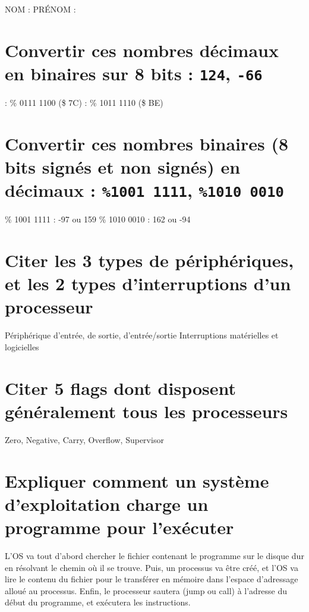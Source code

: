 \documentclass[11pt,a4paper]{article}
\author{Fabrice BOISSIER}
\begin{document}
\setlength{\fboxrule}{2pt}

\noindent {}

\bigskip

NOM : \hspace{6.5cm} PR\'ENOM :

\smallskip

\section{Convertir ces nombres décimaux en binaires sur 8 bits : \texttt{124}, \texttt{-66}}

 : \% 0111 1100 (\$ 7C)	 : \% 1011 1110 (\$ BE)
\bigskip

\section{Convertir ces nombres binaires (8 bits signés et non signés) en décimaux : \texttt{\%1001 1111}, \texttt{\%1010 0010}}

\bigskip
\% 1001 1111 : -97 ou 159	\qquad	\% 1010 0010 : 162 ou -94
\bigskip

\section{Citer les 3 types de périphériques, et les 2 types d'interruptions d'un processeur}

\bigskip
Périphérique d'entrée, de sortie, d'entrée/sortie \qquad Interruptions matérielles et logicielles
\bigskip

\section{Citer 5 flags dont disposent généralement tous les processeurs}

\bigskip
Zero, Negative, Carry, Overflow, Supervisor
\bigskip

\section{Expliquer comment un système d'exploitation charge un programme pour l'exécuter}

\bigskip

\noindent L'OS va tout d'abord chercher le fichier contenant le programme sur le disque dur en résolvant le chemin où il se trouve.
Puis, un processus va être créé, et l'OS va lire le contenu du fichier pour le transférer en mémoire dans l'espace d'adressage alloué au processus.
Enfin, le processeur sautera (jump ou call) à l'adresse du début du programme, et exécutera les instructions.
\end{document}
